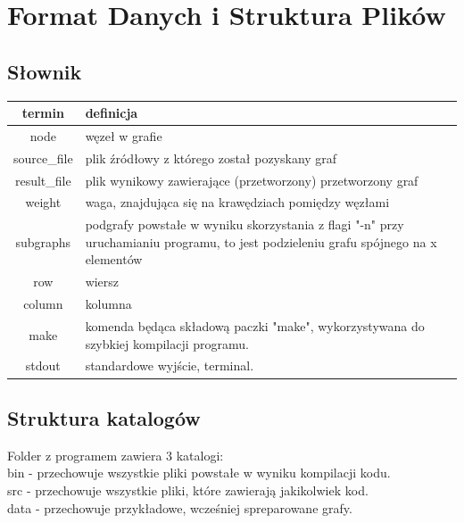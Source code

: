\documentclass{article}
\begin{document}
\section{Format Danych i Struktura Plików}

\subsection{Słownik}

\begin{tabular}{|c|p{28em}|}
\hline
\textbf{termin} & \textbf{definicja} \\
\hline
node & węzeł w grafie \\
\hline
source\_file & plik źródłowy z którego został pozyskany graf \\
\hline
result\_file & plik wynikowy zawierające (przetworzony) przetworzony graf \\
\hline
weight & waga, znajdująca się na krawędziach pomiędzy węzłami \\
\hline
subgraphs & podgrafy powstałe w wyniku skorzystania z flagi "-n" przy uruchamianiu programu, to jest podzieleniu grafu spójnego na x elementów \\
\hline
row & wiersz \\
\hline
column & kolumna \\
\hline
make & komenda będąca składową paczki "make", wykorzystywana do szybkiej kompilacji programu. \\
\hline
stdout & standardowe wyjście, terminal.\\
\hline
\end{tabular}

\subsection{Struktura katalogów}
Folder z programem zawiera 3 katalogi:
\\
bin - przechowuje wszystkie pliki powstałe w wyniku kompilacji kodu.
\\
src - przechowuje wszystkie pliki, które zawierają jakikolwiek kod.
\\
data - przechowuje przykładowe, wcześniej spreparowane grafy.
\end{document}
